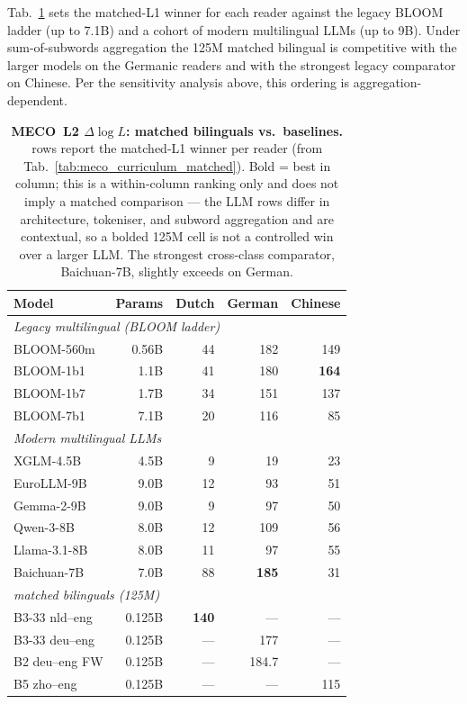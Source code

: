 Tab.~\ref{tab:meco_baseline_comparators} sets the matched-L1 \beetle{} winner for each reader against the legacy BLOOM ladder (up to 7.1B) and a cohort of modern multilingual LLMs (up to 9B). Under sum-of-subwords aggregation the 125M matched bilingual is competitive with the larger models on the Germanic readers and with the strongest legacy comparator on Chinese. Per the sensitivity analysis above, this ordering is aggregation-dependent.
 
\begin{table}[!ht]
  \centering
  \small
  \caption{\textbf{MECO~L2 $\Delta\log L$: \beetle{} matched bilinguals vs.\ baselines.} \beetle{} rows report the matched-L1 winner per reader (from Tab.~\ref{tab:meco_curriculum_matched}). Bold = best in column; this is a within-column ranking only and does not imply a matched comparison --- the LLM rows differ in architecture, tokeniser, and subword aggregation and are contextual, so a bolded 125M \beetle{} cell is not a controlled win over a larger LLM. The strongest cross-class comparator, Baichuan-7B, slightly exceeds \beetle{} on German.}
  \label{tab:meco_baseline_comparators}
  \begin{tabular}{lrrrr}
    \toprule
    Model & Params & Dutch & German & Chinese \\
    \midrule
    \multicolumn{5}{l}{\textit{Legacy multilingual (BLOOM ladder)}} \\
    BLOOM-560m            & 0.56B & 44 & 182 & 149 \\
    BLOOM-1b1             & 1.1B  & 41 & 180 & \textbf{164} \\
    BLOOM-1b7             & 1.7B  & 34 & 151 & 137 \\
    BLOOM-7b1             & 7.1B  & 20 & 116 & 85 \\
    \midrule
    \multicolumn{5}{l}{\textit{Modern multilingual LLMs}} \\
    XGLM-4.5B             & 4.5B  & 9  & 19  & 23 \\
    EuroLLM-9B            & 9.0B  & 12 & 93  & 51 \\
    Gemma-2-9B            & 9.0B  & 9  & 97  & 50 \\
    Qwen-3-8B             & 8.0B  & 12 & 109 & 56 \\
    Llama-3.1-8B          & 8.0B  & 11 & 97  & 55 \\
    Baichuan-7B           & 7.0B  & 88 & \textbf{185} & 31 \\
    \midrule
    \multicolumn{5}{l}{\textit{\beetle{} matched bilinguals (125M)}} \\
    B3-33 nld--eng        & 0.125B & \textbf{140} & ---          & --- \\
    B3-33 deu--eng        & 0.125B & ---          & 177          & --- \\
    B2 deu--eng FW        & 0.125B & ---          & 184.7        & --- \\
    B5 zho--eng           & 0.125B & ---          & ---          & 115 \\
    \bottomrule
  \end{tabular}
\end{table}
 
